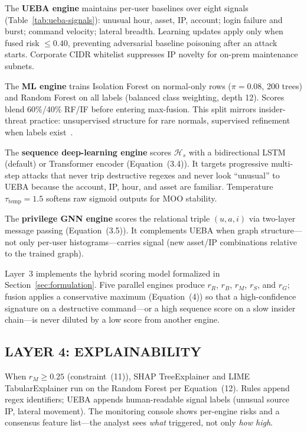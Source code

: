\documentclass{ieeeaccess}
\begin{document}
The \textbf{UEBA engine} maintains per-user baselines over eight signals (Table~\ref{tab:ueba-signals}): unusual hour, asset, IP, account; login failure and burst; command velocity; lateral breadth. Learning updates apply only when fused risk $\leq 0.40$, preventing adversarial baseline poisoning after an attack starts. Corporate CIDR whitelist suppresses IP novelty for on-prem maintenance subnets.

The \textbf{ML engine} trains Isolation Forest on normal-only rows ($\pi=0.08$, 200 trees) and Random Forest on all labels (balanced class weighting, depth 12). Scores blend 60\%/40\% RF/IF before entering max-fusion. This split mirrors insider-threat practice: unsupervised structure for rare normals, supervised refinement when labels exist~\cite{ref9,ref11}.

The \textbf{sequence deep-learning engine} scores $\mathcal{H}_s$ with a bidirectional LSTM (default) or Transformer encoder (Equation~(3.4)). It targets progressive multi-step attacks that never trip destructive regexes and never look ``unusual'' to UEBA because the account, IP, hour, and asset are familiar. Temperature $\tau_{\mathrm{temp}}{=}1.5$ softens raw sigmoid outputs for MOO stability.

The \textbf{privilege GNN engine} scores the relational triple $(u,a,i)$ via two-layer message passing (Equation~(3.5)). It complements UEBA when graph structure---not only per-user histograms---carries signal (new asset/IP combinations relative to the trained graph).

Layer~3 implements the hybrid scoring model formalized in Section~\ref{sec:formulation}. Five parallel engines produce $r_R$, $r_B$, $r_M$, $r_S$, and $r_G$; fusion applies a conservative maximum (Equation~(4)) so that a high-confidence signature on a destructive command---or a high sequence score on a slow insider chain---is never diluted by a low score from another engine.

\subsection{LAYER 4: EXPLAINABILITY}
When $r_M\geq 0.25$ (constraint~(11)), SHAP TreeExplainer and LIME TabularExplainer run on the Random Forest per Equation~(12). Rules append regex identifiers; UEBA appends human-readable signal labels (unusual source IP, lateral movement). The monitoring console shows per-engine risks and a consensus feature list---the analyst sees \textit{what} triggered, not only \textit{how high}.
\end{document}
